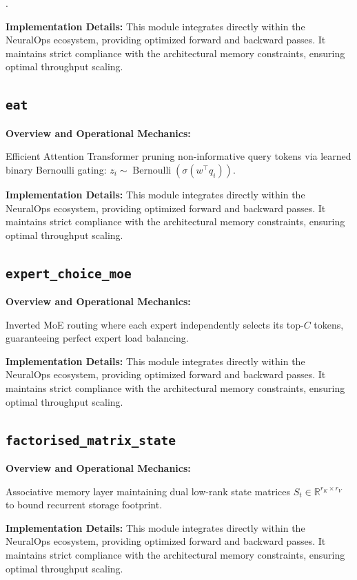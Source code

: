 \documentclass[10pt,twocolumn,letterpaper]{article}
\begin{document}
.

\textbf{Implementation Details:}
This module integrates directly within the NeuralOps ecosystem, providing optimized forward and backward passes. It maintains strict compliance with the architectural memory constraints, ensuring optimal throughput scaling.

\subsection{\texttt{eat}}
\textbf{Overview and Operational Mechanics:}

Efficient Attention Transformer pruning non-informative query tokens via learned binary Bernoulli gating: $z_i \sim \operatorname{Bernoulli}(\sigma(w^\top q_i))$.

\textbf{Implementation Details:}
This module integrates directly within the NeuralOps ecosystem, providing optimized forward and backward passes. It maintains strict compliance with the architectural memory constraints, ensuring optimal throughput scaling.

\subsection{\texttt{expert\_choice\_moe}}
\textbf{Overview and Operational Mechanics:}

Inverted MoE routing where each expert independently selects its top-$C$ tokens, guaranteeing perfect expert load balancing.

\textbf{Implementation Details:}
This module integrates directly within the NeuralOps ecosystem, providing optimized forward and backward passes. It maintains strict compliance with the architectural memory constraints, ensuring optimal throughput scaling.

\subsection{\texttt{factorised\_matrix\_state}}
\textbf{Overview and Operational Mechanics:}

Associative memory layer maintaining dual low-rank state matrices $S_t \in \mathbb{R}^{r_K \times r_V}$ to bound recurrent storage footprint.

\textbf{Implementation Details:}
This module integrates directly within the NeuralOps ecosystem, providing optimized forward and backward passes. It maintains strict compliance with the architectural memory constraints, ensuring optimal throughput scaling.
\end{document}
